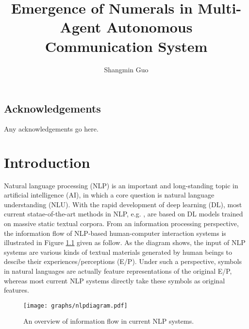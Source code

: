 \documentclass[msc,deptreport]{infthesis} %
\begin{document}
\begin{preliminary}

\title{Emergence of Numerals in Multi-Agent Autonomous Communication System}

\author{Shangmin Guo}


\maketitle

\section*{Acknowledgements}
Any acknowledgements go here. 

\tableofcontents
\end{preliminary}


\chapter{Introduction}
\label{ch1:intro}

Natural language processing (NLP) is an important and long-standing topic in artificial intelligence (AI), in which a core question is natural language understanding (NLU). With the rapid development of deep learning (DL), most current statae-of-the-art methods in NLP, e.g. \cite{socher2013recursive, word2vec2013, kim2014cnn}, are based on DL models trained on massive static textual corpora. From an information processing perspective, the information flow of NLP-based human-computer interaction systems is illustrated in Figure \ref{fig1:nlpdiagram} given as follow. As the diagram shows, the input of NLP systems are various kinds of textual materials generated by human beings to descibe their experiences/perceptions (E/P). Under such a perspective, symbols in natural languages are actually feature representations of the original E/P, whereas most current NLP systems directly take these symbols as original features.

\begin{figure}[!h]
  \centering
  \texttt{[image: graphs/nlpdiagram.pdf]}
  \caption{An overview of information flow in current NLP systems.}
  \label{fig1:nlpdiagram}
\end{figure}
\end{document}
